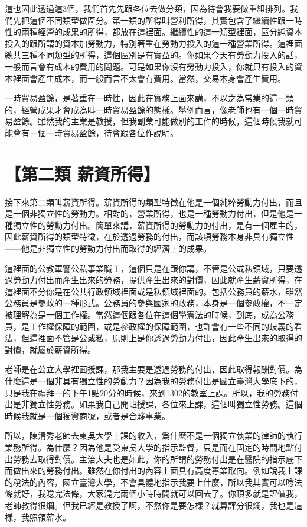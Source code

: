 \documentclass[]{ctexbook}
\begin{document}
這也因此透過這3個，我們首先先跟各位去做分類，因為待會我要做重組排列。我們先把這個不同類型做區分。第一類的所得叫營利所得，其實包含了繼續性跟一時性的兩種經營的成果的所得，都放在這裡面。繼續性的這一類型裡面，區分純資本投入的跟所謂的資本加勞動力，特別著重在勞動力投入的這一種營業所得。這裡面總共三種不同類型的所得，這個區別是有實益的。你如果今天有勞動力投入的話，一般而言會有成本的費用的問題。可是如果你沒有勞動力投入，你就只有投入的資本裡面會產生成本，而一般而言不太會有費用。當然，交易本身會產生費用。

一時貿易盈餘，是著重在一時性，因此在實務上面來講，不以之為常業的這一類的，經營成果才會成為叫一時貿易盈餘的態樣。舉例而言，像老師也有一個一時貿易盈餘。雖然我的主業是教授，但我副業可能做別的工作的時候，這個時候我就可能會有一個一時貿易盈餘，待會跟各位作說明。

\hypertarget{ux7b2cux4e8cux985e-ux85aaux8cc7ux6240ux5f97}{%
\section{【第二類 薪資所得】}\label{ux7b2cux4e8cux985e-ux85aaux8cc7ux6240ux5f97}}

接下來第二類叫薪資所得。薪資所得的類型特徵在他是一個純粹勞動力付出，而且是一個非獨立性的勞動力。相對的，營業所得，也是一種勞動力付出，但是他是一種獨立性的勞動力付出。簡單來講，薪資所得的勞動力的付出，是有一個雇主的，因此薪資所得的類型特徵，在於透過勞務的付出，而該項勞務本身非具有獨立性------他是非獨立性的勞動力付出而取得的經濟上的成果。

這裡面的公教軍警公私事業職工，這個只是在跟你講，不管是公或私領域，只要透過勞動力付出而產生出來的勞務，提供產生出來的對價，因此就產生薪資所得，在這裡面不分你是在公共行政領域裡面或是私領域裡面的。包括公務員的薪水，雖然公務員是參政的一種形式。公務員的參與國家的政務，本身是一個參政權，不一定被理解為是一個工作權。當然這個跟各位在這個學憲法的時候，到底，成為公務員，是工作權保障的範圍，或是參政權的保障範圍，也許會有一些不同的歧義的看法，但這裡面不管是公或私，原則上是你透過勞動力付出，因此產生出來的取得的對價，就屬於薪資所得。

老師是在公立大學裡面授課，那我主要是透過勞務的付出，因此取得報酬對價。為什麼這是一個非具有獨立性的勞動力？因為我的勞務付出是國立臺灣大學底下的，只是我在禮拜一的下午1點20分的時候，來到1302的教室上課。所以，我的勞務付出是非獨立性勞務。如果我自己開班授課，各位來上課，這個叫獨立性勞務。這個時候我就是一個獨資商號，或者是合夥事業。

所以，陳清秀老師去東吳大學上課的收入，爲什麽不是一個獨立執業的律師的執行業務所得。為什麼？因為他是受東吳大學的指示監督，只是而在固定的時間地點付出勞務去取得對價。主治大夫也是如此，你的所謂的勞務付出是在醫院的指示底下而做出來的勞務付出。雖然在你付出的內容上面具有高度專業取向。例如說我上課的稅法的內容，國立臺灣大學，不會具體地指示我要上什麼，所以我其實可以唸法條就好，我唸完法條，大家混完兩個小時時間就可以回去了。你頂多就是評價我，老師教得很爛。但我已經是教授了啊，不然你是要怎樣？就算評分很爛，我也是這樣，我照領薪水。
\end{document}
